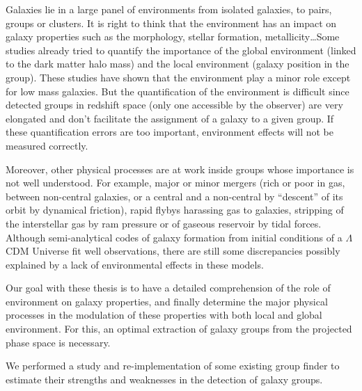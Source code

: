 \onecolumn%
%
\makeatletter
\newcommand*{\clearevenpage}{%
  \clearpage
    \if@twoside
    \ifodd\c@page
      \hbox{}\newpage
      \if@twocolumn
        \hbox{}\newpage
      \fi
    \fi
  \fi
}
\makeatother
%
\clearevenpage\thispagestyle{empty}
%
\bartbackground%
%
\begin{bartabstract}
    \small
    Galaxies lie in a large panel of environments from isolated galaxies, to
    pairs, groups or clusters. It is right to think that the environment has an
    impact on galaxy properties such as the morphology, stellar formation,
    metallicity\ldots Some studies already tried to quantify the importance of
    the global environment (linked to the dark matter halo mass) and the local
    environment (galaxy position in the group). These studies have shown that
    the environment play a minor role except for low mass galaxies. But the
    quantification of the environment is difficult since detected groups in
    redshift space (only one accessible by the observer) are very elongated and
    don't facilitate the assignment of a galaxy to a given group. If these
    quantification errors are too important, environment effects will not be
    measured correctly.

    Moreover, other physical processes are at work inside groups whose
    importance is not well understood. For example, major or minor mergers
    (rich or poor in gas, between non-central galaxies, or a central and a
    non-central by ``descent'' of its orbit by dynamical friction), rapid
    flybys harassing gas to galaxies, stripping of the interstellar gas by ram
    pressure or of gaseous reservoir by tidal forces. Although semi-analytical
    codes of galaxy formation from initial conditions of a $\Lambda$CDM
    Universe fit well observations, there are still some discrepancies possibly
    explained by a lack of environmental effects in these models.

    Our goal with these thesis is to have a detailed comprehension of the role
    of environment on galaxy properties, and finally determine the major
    physical processes in the modulation of these properties with both local
    and global environment. For this, an optimal extraction of galaxy groups
    from the projected phase space is necessary.

    We performed a study and re-implementation of some existing group finder to
    estimate their strengths and weaknesses in the detection of galaxy groups.


\end{bartabstract}
